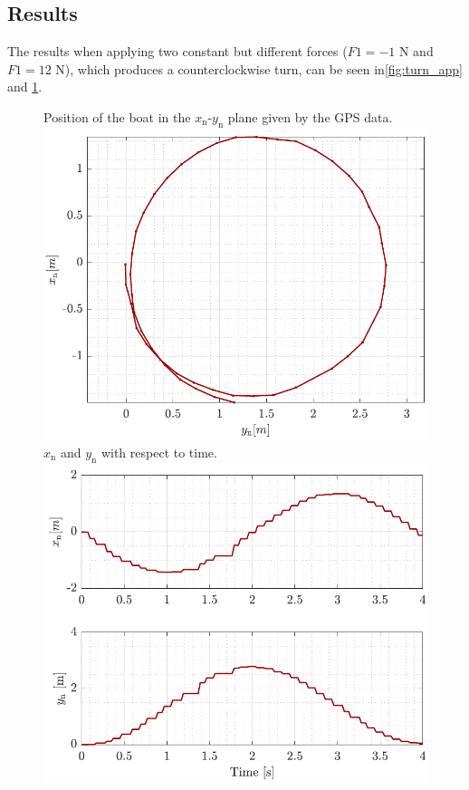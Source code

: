 \subsection*{Results}
The results when applying two constant but different forces ($F1=-1$ N and $F1=12$ N), which produces a counterclockwise turn, can be seen in\autoref{fig:turn_app} and \ref{fig:turn_time_app}.
\begin{figure}[H]
    \captionbox 
    {   
        Position of the boat in the $x_\mathrm{n}$-$y_\mathrm{n}$ plane given by the GPS data.
        \label{fig:turn_app}
    }                                                                 
    {                                                                  
        \includegraphics[width=.45\textwidth]{figures/turn_app}         
    }                                                                    
    \hspace{5pt}                                                          
    \captionbox  
    {      
        $x_\mathrm{n}$ and $y_\mathrm{n}$ with respect to time.
        \label{fig:turn_time_app}
    }                                                                          
    {
        \includegraphics[width=.45\textwidth]{figures/turn_time_app}
    }
\end{figure}